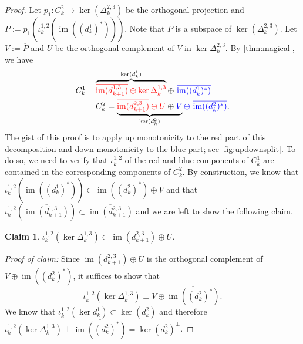 \documentclass[11pt]{article}
\newtheorem{claim}{Claim}[theorem]
\theoremstyle{definition}
\theoremstyle{remark}
\DeclareMathOperator{\im}{im}
\newcommand{\red}[1]{\textcolor{red}{#1}}
\begin{document}
\begin{proof}
    Let $p_1:C^2_k\to \ker(\Delta^{2,3}_k)$ be the orthogonal projection and $P:=p_1\left(\iota_k^{1,2} \left(\overline{\im((d_k^1)^*)}\right)\right)$. Note that $P$ is a subspace of $\ker(\Delta_k^{2,3})$. Let $V:=\overline{P}$ and $U$ be the orthogonal complement of $V$ in $\ker \Delta_k^{2,3}$. 
        By \cref{thm:magical}, we have 
        \begin{align*}
             C_k^1  = & \overbrace{\red{\overline{\im(d_{k+1}^{1,3})}\oplus \ker \Delta_k^{1,3}}}^{\ker(d_k^1)} \oplus \ \textcolor{blue}{\overline{\im((d_k^1)^*)}}\\
             & \, C_k^2 = \underbrace{\red{\overline{\im(d_{k+1}^{2,3})}\oplus U} \oplus \textcolor{blue}{V}}_{\ker(d_k^2)} \textcolor{blue}{\oplus \ \overline{\im((d_k^2)^*)}}.
        \end{align*}
        The gist of this proof is to apply up monotonicity to the red part of this decomposition and down monotonicity to the blue part; see \cref{fig:updownsplit}. To do so, we need to verify that $\iota_k^{1,2}$ of the red and blue components of $C_k^1$ are contained in the corresponding components of $C_k^2$. By construction, we know that $\iota_k^{1,2} \left(\overline{\im((d_k^1)^*)}\right) \subset \overline{\im((d_k^2)^*)} \oplus V$ and that $\iota_k^{1,2}\left(\overline{\im(d_{k+1}^{1,3})}\right) \subset \overline{\im(d_{k+1}^{2,3})}$ and we are left to show the following claim.
        
        \begin{claim} \label{claim:decomp}
            $\iota_k^{1,2} (\ker \Delta_k^{1,3}) \subset \overline{\im(d_{k+1}^{2,3})}\oplus U$.
        \end{claim}
        \textit{Proof of claim:} Since $\overline{\im(d_{k+1}^{2,3})}\oplus U$ is the orthogonal complement of $V \oplus \overline{\im((d_k^2)^*)}$, it suffices to show that $$\iota_k^{1,2} (\ker \Delta_k^{1,3}) \perp V \oplus \overline{\im((d_k^2)^*)}.$$
        We know that $\iota_k^{1,2} (\ker d_k^1) \subset \ker(d_k^2)$ and therefore $\iota_k^{1,2} (\ker \Delta_k^{1,3}) \perp \overline{\im((d_k^2)^*)}=\ker(d_k^2)^\perp$.
        

\end{proof}
\end{document}
